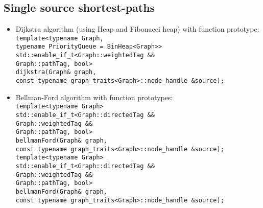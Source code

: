 \documentclass{article}
\begin{document}
\pagebreak

\subsection*{Single source shortest-paths}
\begin{itemize}
	\item Dijkstra algorithm (using Heap and Fibonacci heap) with function prototype:\\
		\texttt{template<typename Graph,\\\hspace*{4.75em}
			typename PriorityQueue = BinHeap<Graph>>\\
			std::enable\_if\_t<Graph::weightedTag \&\&\\\hspace*{7.67em}
			Graph::pathTag, bool>\\
			dijkstra(Graph\& graph,\\\hspace*{4.27em}
			const typename graph\_traits<Graph>::node\_handle \&source);}

	\item Bellman-Ford algorithm with function prototypes:\\
		\texttt{template<typename Graph>\\
			std::enable\_if\_t<Graph::directedTag \&\&\\\hspace*{7.67em}
			Graph::weightedTag \&\&\\\hspace*{7.67em}
			Graph::pathTag, bool>\\
			bellmanFord(Graph\& graph,\\\hspace*{5.5em}
			const typename graph\_traits<Graph>::node\_handle \&source);} \\

		\texttt{template<typename Graph>\\
			std::enable\_if\_t<Graph::directedTag \&\&\\\hspace*{7.67em}
			Graph::weightedTag \&\&\\\hspace*{7.67em}
			Graph::pathTag, bool>\\
			bellmanFord(Graph\& graph,\\\hspace*{5.27em}
			const typename graph\_traits<Graph>::node\_handle \&source);}


\end{itemize}
\end{document}
